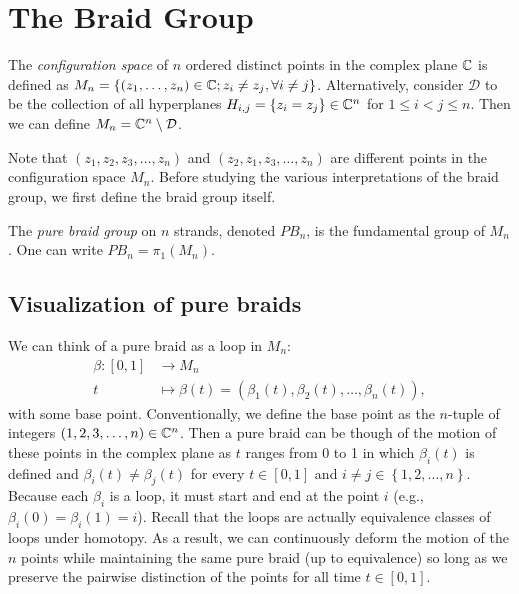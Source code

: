 \chapter{The Braid Group}\label{ch:braid_group}

\begin{definition}
    The \textit{configuration space} of $n$ ordered distinct points in the complex plane $\mathbb{C}$ is defined as $M_n = \left\{ \left( z_1,\dots,z_n \right)\in\mathbb{C} ; z_i\neq z_j,\forall i\neq j \right\}$. Alternatively, consider $\mathcal{D}$ to be the collection of all hyperplanes $H_{i,j}=\left\{ z_i=z_j \right\}\in\mathbb{C}^n$ for $1\leq i < j \leq n$. Then we can define $M_n = \mathbb{C}^n \setminus \mathcal{D}$.
\end{definition}

Note that $\left( z_1,z_2,z_3,\dots,z_n \right)$ and $\left( z_2,z_1,z_3,\dots,z_n \right)$ are different points in the configuration space $M_n$. Before studying the various interpretations of the braid group, we first define the braid group itself.

\begin{definition}
    The \textit{pure braid group} on $n$ strands, denoted $PB_n$, is the fundamental group of $M_n$. One can write $PB_n = \pi_1(M_n)$.
\end{definition}

\section{Visualization of pure braids}

We can think of a pure braid as a loop in $M_n$:
\begin{align*}
    \beta : \left[ 0,1 \right] &\to M_n \\
    t &\mapsto \beta(t) = \left( \beta_1(t),\beta_2(t),\dots,\beta_n(t) \right),
\end{align*}
with some base point. Conventionally, we define the base point as the $n$-tuple of integers $(1,2,3,\dots,n)\in \mathbb{C}^n$. Then a pure braid can be though of the motion of these points in the complex plane as $t$ ranges from 0 to 1 in which $\beta_i(t)$ is defined and $\beta_i(t)\neq \beta_j(t)$ for every $t\in[0,1]$ and $i\neq j\in\left\{ 1,2,\dots,n \right\}$. Because each $\beta_i$ is a loop, it must start and end at the point $i$ (e.g., $\beta_i(0)=\beta_i(1)=i$). Recall that the loops are actually equivalence classes of loops under homotopy. As a result, we can continuously deform the motion of the $n$ points while maintaining the same pure braid (up to equivalence) so long as we preserve the pairwise distinction of the points for all time $t\in[0,1]$.

